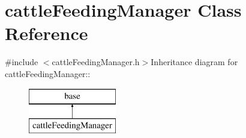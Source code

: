 \hypertarget{classcattle_feeding_manager}{
\section{cattleFeedingManager Class Reference}
\label{classcattle_feeding_manager}
}


{\ttfamily \#include $<$cattleFeedingManager.h$>$}Inheritance diagram for cattleFeedingManager::\begin{figure}[H]
\begin{center}
\leavevmode
\includegraphics[height=2cm]{classcattle_feeding_manager}
\end{center}
\end{figure}
